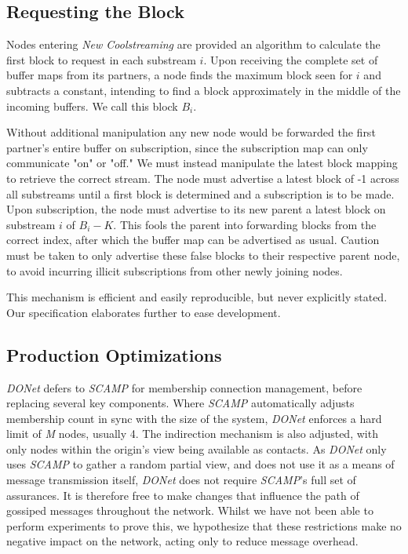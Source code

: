 \documentclass[12pt,a4paper]{article}
\begin{document}
\subsection{Requesting the Block} \label{problems:requesting}
Nodes entering \textit{New Coolstreaming} are provided an algorithm to calculate the first block to request in each substream \(i\). Upon receiving the complete set of buffer maps from its partners, a node finds the maximum block seen for \(i\) and subtracts a constant, intending to find a block approximately in the middle of the incoming buffers. We call this block \(B_i\).

Without additional manipulation any new node would be forwarded the first partner's entire buffer on subscription, since the subscription map can only communicate "on" or "off." We must instead manipulate the latest block mapping to retrieve the correct stream. The node must advertise a latest block of -1 across all substreams until a first block is determined and a subscription is to be made. Upon subscription, the node must advertise to its new parent a latest block on substream \(i\) of \(B_i - K\). This fools the parent into forwarding blocks from the correct index, after which the buffer map can be advertised as usual. Caution must be taken to only advertise these false blocks to their respective parent node, to avoid incurring illicit subscriptions from other newly joining nodes.

This mechanism is efficient and easily reproducible, but never explicitly stated. Our specification elaborates further to ease development.

\subsection{Production Optimizations} \label{problems:prodopt}
\textit{DONet} defers to \textit{SCAMP} for membership connection management, before replacing several key components. Where \textit{SCAMP} automatically adjusts membership count in sync with the size of the system, \textit{DONet} enforces a hard limit of \textit{M} nodes, usually 4. The indirection mechanism is also adjusted, with only nodes within the origin's view being available as contacts. As \textit{DONet} only uses \textit{SCAMP} to gather a random partial view, and does not use it as a means of message transmission itself, \textit{DONet} does not require \textit{SCAMP}'s full set of assurances. It is therefore free to make changes that influence the path of gossiped messages throughout the network. Whilst we have not been able to perform experiments to prove this, we hypothesize that these restrictions make no negative impact on the network, acting only to reduce message overhead.
\end{document}
